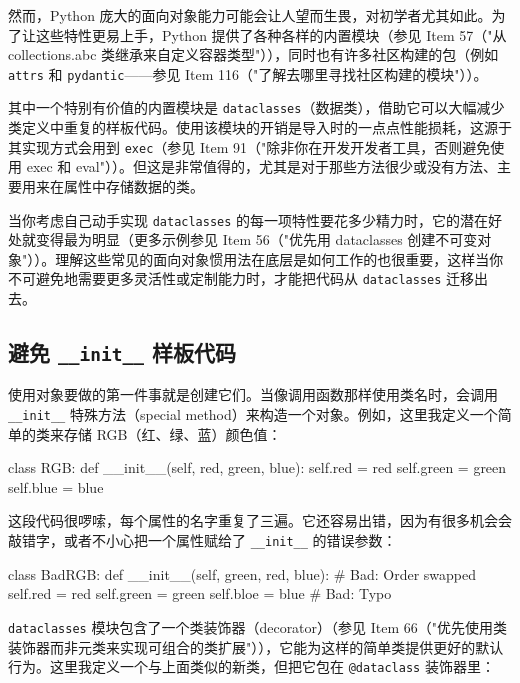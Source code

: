 然而，Python 庞大的面向对象能力可能会让人望而生畏，对初学者尤其如此。为了让这些特性更易上手，Python 提供了各种各样的内置模块（参见 Item 57（"从 collections.abc 类继承来自定义容器类型"）），同时也有许多社区构建的包（例如 \texttt{attrs} 和 \texttt{pydantic}——参见 Item 116（"了解去哪里寻找社区构建的模块"））。

其中一个特别有价值的内置模块是 \texttt{dataclasses}（数据类），借助它可以大幅减少类定义中重复的样板代码。使用该模块的开销是导入时的一点点性能损耗，这源于其实现方式会用到 \texttt{exec}（参见 Item 91（"除非你在开发开发者工具，否则避免使用 exec 和 eval"））。但这是非常值得的，尤其是对于那些方法很少或没有方法、主要用来在属性中存储数据的类。

当你考虑自己动手实现 \texttt{dataclasses} 的每一项特性要花多少精力时，它的潜在好处就变得最为明显（更多示例参见 Item 56（"优先用 dataclasses 创建不可变对象"））。理解这些常见的面向对象惯用法在底层是如何工作的也很重要，这样当你不可避免地需要更多灵活性或定制能力时，才能把代码从 \texttt{dataclasses} 迁移出去。

\subsection{避免 \texttt{\_\_init\_\_} 样板代码}

使用对象要做的第一件事就是创建它们。当像调用函数那样使用类名时，会调用 \texttt{\_\_init\_\_} 特殊方法（special method）来构造一个对象。例如，这里我定义一个简单的类来存储 RGB（红、绿、蓝）颜色值：

\begin{codebox}[python]
class RGB:
    def __init__(self, red, green, blue):
        self.red = red
        self.green = green
        self.blue = blue
\end{codebox}

这段代码很啰嗦，每个属性的名字重复了三遍。它还容易出错，因为有很多机会会敲错字，或者不小心把一个属性赋给了 \texttt{\_\_init\_\_} 的错误参数：

\begin{codebox}[python]
class BadRGB:
    def __init__(self, green, red, blue):  # Bad: Order swapped
        self.red = red
        self.green = green
        self.bloe = blue                   # Bad: Typo
\end{codebox}

\texttt{dataclasses} 模块包含了一个类装饰器（decorator）（参见 Item 66（"优先使用类装饰器而非元类来实现可组合的类扩展"）），它能为这样的简单类提供更好的默认行为。这里我定义一个与上面类似的新类，但把它包在 \texttt{@dataclass} 装饰器里：

